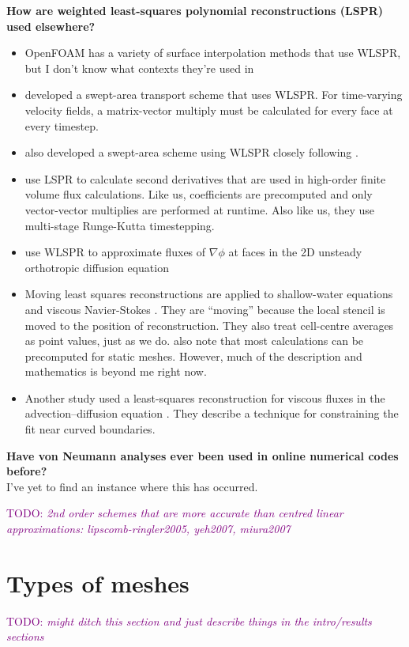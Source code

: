 \documentclass[times]{elsarticle}
\newcommand{\TODO}[1]{\textcolor{purple}{TODO: \emph{#1}}}
\begin{document}
\textbf{How are weighted least-squares polynomial reconstructions (LSPR) used elsewhere?}
\begin{itemize}
	\item OpenFOAM has a variety of surface interpolation methods that use WLSPR, but I don't know what contexts they're used in
	\item \citep{lashley2002} developed a swept-area transport scheme that uses WLSPR.  For time-varying velocity fields, a matrix-vector multiply must be calculated for every face at every timestep.
	\item \citep{skamarock-menchaca2010} also developed a swept-area scheme using WLSPR closely following \citep{lashley2002}.
	\item \citep{skamarock-gassmann2011} use LSPR to calculate second derivatives that are used in high-order finite volume flux calculations.  Like us, coefficients are precomputed and only vector-vector multiplies are performed at runtime.  Also like us, they use multi-stage Runge-Kutta timestepping.
	\item \citep{jayantha-turner2003} use WLSPR to approximate fluxes of $\nabla \phi$ at faces in the 2D unsteady orthotropic diffusion equation
	\item Moving least squares reconstructions are applied to shallow-water equations \citep{cuetofelgueroso2006} and viscous Navier-Stokes \citep{cuetofelgueroso2007}.  They are ``moving'' because the local stencil is moved to the position of reconstruction.  They also treat cell-centre averages as point values, just as we do.
	\citep{cuetofelgueroso2007} also note that most calculations can be precomputed for static meshes.
	However, much of the description and mathematics is beyond me right now.  
	\item Another study used a least-squares reconstruction for viscous fluxes in the advection--diffusion equation \citep{olliviergooch-vanaltena2002}.  They describe a technique for constraining the fit near curved boundaries.
\end{itemize}

\textbf{Have von Neumann analyses ever been used in online numerical codes before?} \\
I've yet to find an instance where this has occurred.


\TODO{2nd order schemes that are more accurate than centred linear approximations: lipscomb-ringler2005, yeh2007, miura2007}

\section{Types of meshes}
\TODO{might ditch this section and just describe things in the intro/results sections}
\end{document}
